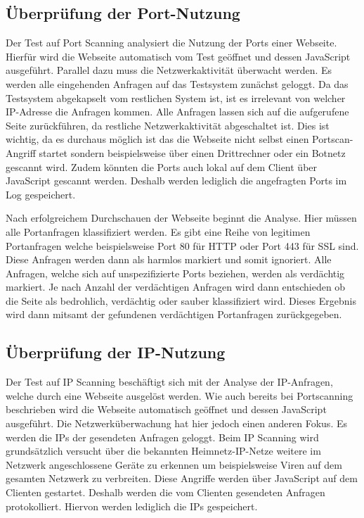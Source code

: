 
\subsection{Überprüfung der Port-Nutzung}
Der Test auf Port Scanning analysiert die Nutzung der Ports einer Webseite. Hierfür wird die Webseite automatisch vom Test geöffnet und dessen JavaScript ausgeführt. Parallel dazu muss die Netzwerkaktivität überwacht werden. Es werden alle eingehenden Anfragen auf das Testsystem zunächst geloggt. Da das Testsystem abgekapselt vom restlichen System ist, ist es irrelevant von welcher IP-Adresse die Anfragen kommen. Alle Anfragen lassen sich auf die aufgerufene Seite zurückführen, da restliche Netzwerkaktivität abgeschaltet ist. Dies ist wichtig, da es durchaus möglich ist das die Webseite nicht selbst einen Portscan-Angriff startet sondern beispielsweise über einen Drittrechner oder ein Botnetz gescannt wird. Zudem könnten die Ports auch lokal auf dem Client über JavaScript gescannt werden. Deshalb werden lediglich die angefragten Ports im Log gespeichert.

Nach erfolgreichem Durchschauen der Webseite beginnt die Analyse. Hier müssen alle Portanfragen klassifiziert werden. Es gibt eine Reihe von legitimen Portanfragen welche beispielsweise Port 80 für HTTP oder Port 443 für SSL sind. Diese Anfragen werden dann als harmlos markiert und somit ignoriert. Alle Anfragen, welche sich auf unspezifizierte Ports beziehen, werden als verdächtig markiert. Je nach Anzahl der verdächtigen Anfragen wird dann entschieden ob die Seite als bedrohlich, verdächtig oder sauber klassifiziert wird. Dieses Ergebnis wird dann mitsamt der gefundenen verdächtigen Portanfragen zurückgegeben.

\subsection{Überprüfung der IP-Nutzung}
Der Test auf IP Scanning beschäftigt sich mit der Analyse der IP-Anfragen, welche durch eine Webseite ausgelöst werden. Wie auch bereits bei Portscanning beschrieben wird die Webseite automatisch geöffnet und dessen JavaScript ausgeführt. Die Netzwerküberwachung hat hier jedoch einen anderen Fokus. Es werden die IPs der gesendeten Anfragen geloggt. Beim IP Scanning wird grundsätzlich versucht über die bekannten Heimnetz-IP-Netze weitere im Netzwerk angeschlossene Geräte zu erkennen um beispielsweise Viren auf dem gesamten Netzwerk zu verbreiten. Diese Angriffe werden über JavaScript auf dem Clienten gestartet. Deshalb werden die vom Clienten gesendeten Anfragen protokolliert. Hiervon werden lediglich die IPs gespeichert.

